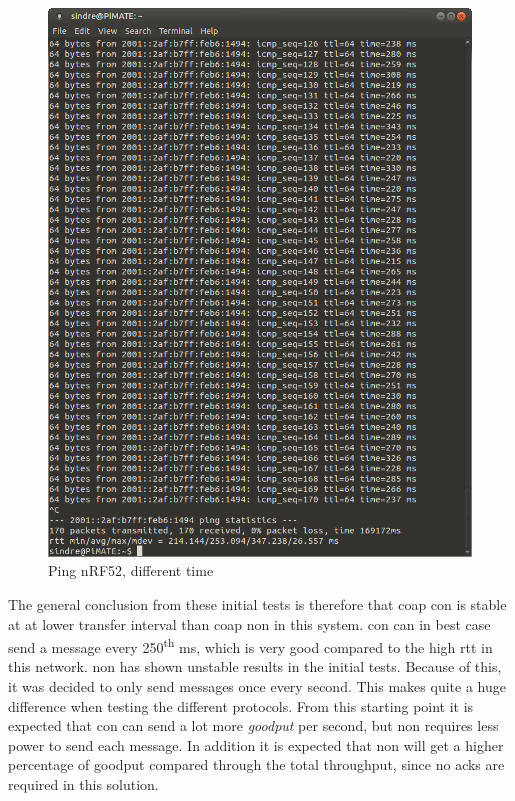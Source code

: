 \begin{figure}[ht]
    \centering
    \includegraphics[scale=0.4]{ping3.png}    
    \caption{Ping nRF52, different time}
    \label{fig:ping2}
\end{figure}


\noindent The general conclusion from these initial tests is therefore that \gls{coap} \gls{con} is stable at at lower transfer interval than \gls{coap} \gls{non} in this system. \gls{con} can in best case send a message every 250\textsuperscript{th} ms, which is very good compared to the high \gls{rtt} in this network. \gls{non} has shown unstable results in the initial tests. Because of this, it was decided to only send messages once every second. This makes quite a huge difference when testing the different protocols. From this starting point it is expected that \gls{con} can send a lot more \textit{goodput} per second, but \gls{non} requires less power to send each message. In addition it is expected that \gls{non} will get a higher percentage of \gls{goodput} compared through the total throughput, since no \glspl{ack} are required in this solution.


